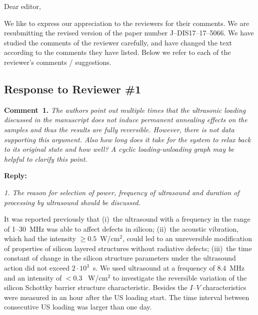 \documentclass[aip,jap,preprint]{revtex4-1}
\begin{document}
Dear editor, 

We like to express our appreciation to the reviewers for their comments. 
We are resubmitting the revised version of the paper number J--DIS17--17--5066. 
We have studied the comments of the reviewer carefully, and have changed the text according to the comments they 
have listed. 
Below we refer to each of the reviewer’s comments / suggestions.



\subsection*{Response to Reviewer \#1 }

\textcolor[rgb]{0.00,0.50,1.00}{\textbf{Comment~1.}}
\emph{The authors point out multiple times that the ultrasonic loading discussed in the manuscript does not induce permanent annealing effects on the samples and thus the results are fully reversible.
However, there is not data supporting this argument. 
Also how long does it take for the system to relax back to its original state and how well? 
A cyclic loading-unloading graph may be helpful to clarify this point.}

\textcolor[rgb]{0.51,0.00,0.00}{\textbf{Reply:}}


\emph{1. The reason for selection of power, frequency of ultrasound and duration of processing by ultrasound should be discussed. }

It was reported previously that
(i)~the ultrasound with a frequency in the range of 1--30~MHz was able to affect defects in silicon; \cite{Ostapenko1995,Davletova2008,Davletova2009,Gorb2010,Ostapenko1999,Podolian2012,Parchinskii2006,Pashaev2014,Mirsagatov}
(ii)~the acoustic vibration, which had the intensity $\geq0.5$~W/cm$^2$, could led to an unreversible  modification of properties of silicon layered structures without radiative defects;\cite{Davletova2008,Davletova2009,Pashaev2014,Mirsagatov,Zaveryukhin2002,Vlasov2009}
(iii)~the time constant of change in the silicon structure parameters under the ultrasound action  did not exceed $2\cdot10^3$~s. \cite{Ostapenko1995,YOlikhTPL2011,Olikh:Ultras,Olikh2011Sem,Ostrovskii2001,OlikhPSS}
We used ultrasound at a frequency of $8.4$~MHz and an intensity of $< 0.3$~ W/cm$^2$ to investigate the reversible variation of the silicon Schottky barrier structure characteristic.
Besides the $I$--$V$ characteristics were measured in an hour after the US loading start.
The time interval between consecutive US loading was larger than one day.
\end{document}
